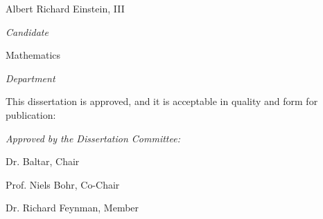 \documentclass[letterpaper,10pt]{article}
\begin{document}
\vspace{0.8in}
\begin{Large}
 \noindent Albert Richard Einstein, III
 \end{Large}

 \noindent\makebox[\linewidth][l]{\rule{3.9in}{1pt}}
  \textit{Candidate} \vspace{0.5in}
 
 \begin{Large}
 \noindent Mathematics
 \end{Large}
 
  \noindent\makebox[\linewidth][l]{\rule{3.9in}{1pt}} 
    \textit{Department} \vspace{0.4in}


 
 
   \noindent This dissertation is approved, and it is acceptable in quality and form for publication: \vspace{0.2in}
\begin{large}
 \noindent \textit{Approved by the Dissertation Committee:} \vspace{1in}
 \end{large}
 
%  
%  
%  

 

 \noindent\makebox[\linewidth]{\rule{5.5in}{1pt}}
 
  \hfill Dr. Baltar, Chair \vfill
 
 
 
 \noindent\makebox[\linewidth]{\rule{5.5in}{1pt}}
 
   \hfill Prof. Niels Bohr, Co-Chair  \vfill
  
  

   \noindent\makebox[\linewidth]{\rule{5.5in}{1pt}}
   
   \hfill Dr. Richard Feynman, Member  \vfill
 
 
    
      

 
\end{document}
